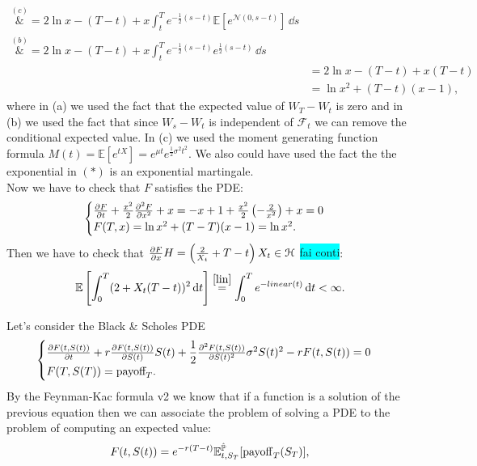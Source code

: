 \begin{example}{}{}{}
\begin{align*}
        \overset{(c)}&{=}
        2\ln x - (T-t) + x\int^T_t e^{-\frac{1}{2}(s-t)} \mathbb{E}\left[e^{\mathcal{N}(0,s-t)}\right] \,\dd s \\
        \overset{(b)}&{=}
        2\ln x - (T-t) + x\int^T_t e^{-\frac{1}{2}(s-t)}e^{\frac{1}{2}(s-t)} \,\dd s \\
        &=
        2\ln x - (T-t) + x(T-t) \\
        &=
        \ln x^2 + (T-t)(x-1),
    \end{align*}
    where in (a) we used the fact that the expected value of $W_T-W_t$ is zero and in (b) we used the fact that since $W_s-W_t$ is independent of $\mathcal{F}_t$ we can remove the conditional expected value. In (c) we used the moment generating function formula ${M(t)=\mathbb{E}[e^{tX}]=e^{\mu t}e^{{\frac {1}{2}}\sigma^{2}t^{2}}}$. We also could have used the fact the the exponential in $(*)$ is an exponential martingale.\\
    Now we have to check that $F$ satisfies the PDE:
    \begin{equation*}
        \begin{cases}
        \pdv{F}{t}(t,x) + \frac{x^2}{2}\pdv[2]{F}{x}(t,x) + x = -x+1+\frac{x^2}{2}\left(-\frac{2}{x^2}\right)+x = 0\\
        F(T,x) = \ln x^2 + (T-T)(x-1) = \ln x^2.
        \end{cases}
    \end{equation*}
    Then we have to check that $\pdv{F}{x}H = \left(\frac{2}{X_t}+T-t\right)X_t\in\mathcal{H}$ \colorbox{cyan}{fai conti}:
    \begin{equation*}
        \mathbb{E}\left[\int^T_0 (2 + X_t(T-t))^2\,\dd t\right] \overset{\eqref{lin}}{=} \int^T_0 e^{-linear(t)}\,\dd t < \infty.
    \end{equation*}
\end{example}
Let's consider the Black \& Scholes PDE
\begin{equation}
    \begin{cases}
    \pdv{F(t,S(t))}{t} + r\pdv{F(t,S(t))}{S(t)} S(t) + \dfrac{1}{2}\pdv[2]{F(t,S(t))}{S(t)}\sigma^2S(t)^2 - rF(t,S(t)) = 0\\
    F(T,S(T)) = \mbox{payoff}_T.
    \end{cases}
\end{equation}
By the Feynman-Kac formula v2 we know that if a function is a solution of the previous equation then we can associate the problem of solving a PDE to the problem of computing an expected value:
\begin{equation}
    F(t,S(t)) = e^{-r(T-t)}\mathbb{E}^{\hat{\mathbb{P}}}_{t,S_T}[\operatorname{payoff}_T(S_T)],
\end{equation}

